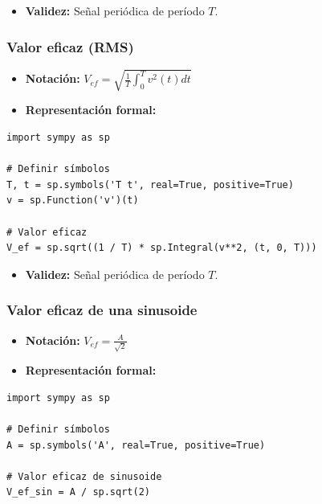 \documentclass[11pt,a4paper]{article}
\begin{document}
\begin{itemize}[leftmargin=*,topsep=2pt,itemsep=1pt]
  \item \textbf{Validez:} Señal periódica de período $T$.
\end{itemize}


\subsubsection*{Valor eficaz (RMS)}


\begin{itemize}[leftmargin=*,topsep=2pt,itemsep=1pt]
  \item \textbf{Notación:} $V_{ef} = \sqrt{\frac{1}{T} \int_0^T v^2(t) dt}$
  \item \textbf{Representación formal:}
\end{itemize}


\begin{lstlisting}
import sympy as sp

# Definir símbolos
T, t = sp.symbols('T t', real=True, positive=True)
v = sp.Function('v')(t)

# Valor eficaz
V_ef = sp.sqrt((1 / T) * sp.Integral(v**2, (t, 0, T)))
\end{lstlisting}


\begin{itemize}[leftmargin=*,topsep=2pt,itemsep=1pt]
  \item \textbf{Validez:} Señal periódica de período $T$.
\end{itemize}


\subsubsection*{Valor eficaz de una sinusoide}


\begin{itemize}[leftmargin=*,topsep=2pt,itemsep=1pt]
  \item \textbf{Notación:} $V_{ef} = \frac{A}{\sqrt{2}}$
  \item \textbf{Representación formal:}
\end{itemize}


\begin{lstlisting}
import sympy as sp

# Definir símbolos
A = sp.symbols('A', real=True, positive=True)

# Valor eficaz de sinusoide
V_ef_sin = A / sp.sqrt(2)
\end{lstlisting}
\end{document}
